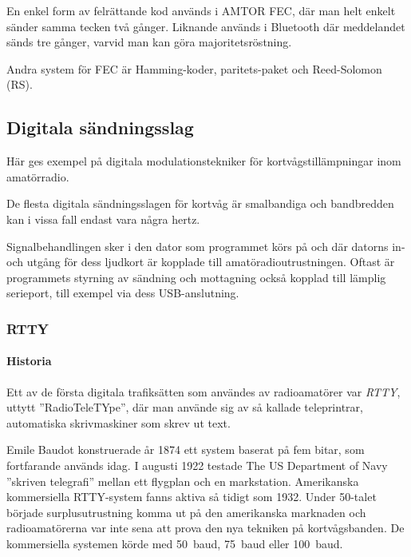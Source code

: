 En enkel form av felrättande kod används i AMTOR FEC, där man helt enkelt
sänder samma tecken två gånger.
Liknande används i Bluetooth där meddelandet sänds tre gånger, varvid man kan
göra majoritetsröstning.

Andra system för FEC är Hamming-koder, paritets-paket och Reed-Solomon (RS).


\subsection{Digitala sändningsslag}

Här ges exempel på digitala modulationstekniker för kortvågstillämpningar inom
amatörradio.

De flesta digitala sändningsslagen för kortvåg är smalbandiga och bandbredden
kan i vissa fall endast vara några hertz.

Signalbehandlingen sker i den dator som programmet körs på och där datorns
in- och utgång för dess ljudkort är kopplade till amatöradioutrustningen.
Oftast är programmets styrning av sändning och mottagning också kopplad till
lämplig serieport, till exempel via dess USB-anslutning.

\subsubsection{RTTY}

\paragraph{Historia}

Ett av de första digitala trafiksätten som användes av radioamatörer var \emph{RTTY},
uttytt ''RadioTeleTYpe'', där man använde sig av så kallade teleprintrar,
automatiska skrivmaskiner som skrev ut text.

Emile Baudot konstruerade år 1874 ett system baserat på fem bitar,
som fortfarande används idag.
I augusti 1922 testade The US Department of Navy ''skriven telegrafi'' mellan
ett flygplan och en markstation.
Amerikanska kommersiella RTTY-system fanns aktiva så tidigt som 1932.
Under 50-talet började surplusutrustning komma ut på den amerikanska
marknaden och radioamatörerna var inte sena att prova den nya tekniken på
kortvågsbanden.
De kommersiella systemen körde med 50~baud, 75~baud eller 100~baud.

